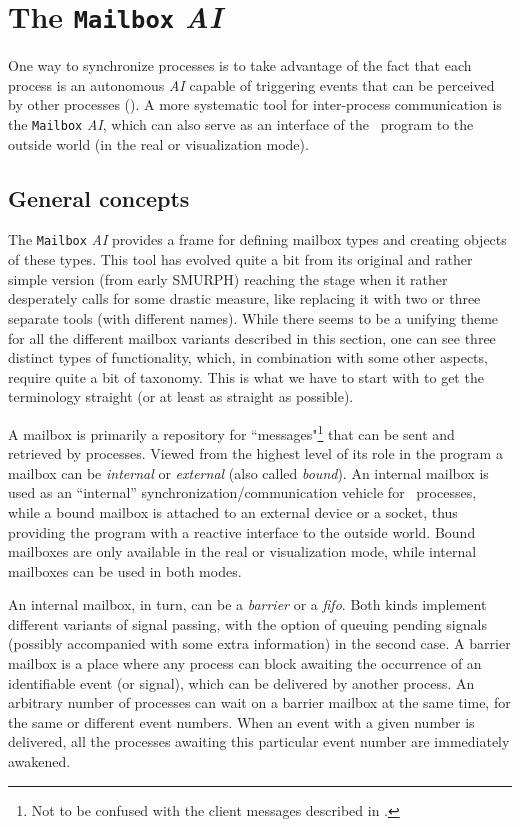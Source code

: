 \section{The {\tt Mailbox} {\em AI}}
\label{rm_mb}

One way to synchronize processes is to take advantage of the
fact that each process is an autonomous {\em AI} capable of triggering
events that can be perceived by other processes ().
A more systematic tool for inter-process communication is
the {\tt Mailbox} {\em AI}, which can also serve as an interface of the
\smurph\ program to the outside world (in the real or visualization mode).

\subsection{General concepts}
\label{rm_mb_gc}

The {\tt Mailbox} {\em AI\/} provides a frame for defining mailbox types
and creating objects of these types.
This tool has evolved quite a bit from its original and rather simple
version (from early {\sc SMURPH})
reaching the stage when it rather desperately calls for some drastic measure,
like replacing it with two or three separate tools (with different names).
While there seems to be a unifying theme for all the different mailbox variants
described in this section, one can see three distinct types of functionality,
which, in combination with some other aspects, require quite a bit of
taxonomy.
This is what we have to start with to get the terminology straight (or at least
as straight as possible).

A mailbox is primarily a repository for
``messages"\footnote{Not to be confused with the client messages described
in .} that can be sent and retrieved by processes.
Viewed from the highest level of its role  in the program a mailbox can be
{\em internal\/} or {\em external\/} (also called {\em bound\/}).
An internal mailbox is used as an ``internal''
synchronization/communication vehicle for 
\smurph\ processes, while a bound mailbox is
attached to an external device or a socket, thus providing the program with a reactive interface to the outside world.
Bound mailboxes are only available in the real or visualization
mode, while internal mailboxes can be used in both modes.

An internal mailbox, in turn, can be a {\em barrier\/} or a {\em fifo}.
Both kinds implement different variants of signal passing, with the option
of queuing pending signals (possibly accompanied with some extra information)
in the second case.
A barrier mailbox is a place where any process can block awaiting the
occurrence of an identifiable event (or signal), which can be delivered
by another process.
An arbitrary number of processes can wait on a barrier mailbox at the same
time, for the same or different event numbers.
When an event with a given number is delivered, all the processes awaiting
this particular event number are immediately awakened.


